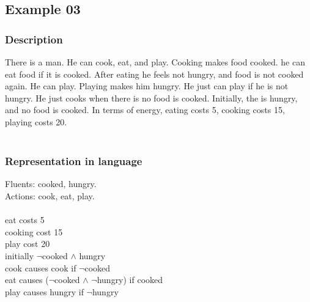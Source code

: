 \documentclass[11pt]{article}
\begin{document}
\subsection{Example 03}
	\subsubsection{Description}\label{par:p103}
	There is a man. He can cook, eat, and play. Cooking makes food cooked. he can eat food if it is cooked. After eating he feels not hungry, and food is not cooked again. He can play. Playing makes him hungry. He just can play if he is not hungry. He just cooks when there is no food is cooked. Initially, the is hungry, and no food is cooked. In terms of energy, eating costs 5, cooking costs 15, playing costs 20.\\
	\\
	\subsubsection{Representation in language}\label{par:p203}
	Fluents: cooked, hungry.\\
	Actions: cook, eat, play.\\
	\\
	eat costs 5\\
	cooking cost 15\\
	play cost 20\\
	initially $\neg$cooked $\land$ hungry\\
	cook causes cook if $\neg$cooked\\
	eat causes ($\neg$cooked $\land$ $\neg$hungry) if cooked\\
	play causes hungry if $\neg$hungry\\
	\\
\end{document}
